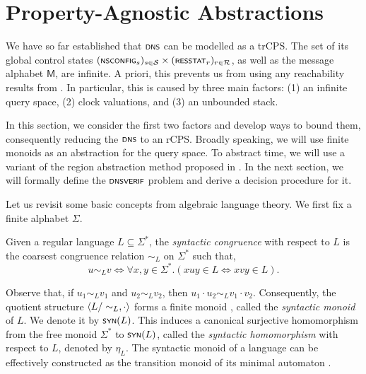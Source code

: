 \section{\label{sec:property-agnostic}Property-Agnostic Abstractions}

We have so far established that $\scrsf{dns}$ can be modelled as a trCPS. The set of its global control states $(\scrsf{nsconfig}_{s})_{s\in\cal S} \times (\scrsf{resstat}_r)_{r\in\cal R}$, as well as the message alphabet $\mathsf M$, are infinite. A priori, this prevents us from using any reachability results from . In particular, this is caused by three main factors: (1) an infinite query space, (2) clock valuations, and (3) an unbounded stack.

In this section, we  consider the first two factors and develop ways to bound them, consequently reducing the $\scrsf{dns}$ to an rCPS. Broadly speaking, we will use finite monoids as an abstraction for the query space. To abstract time, we will use a variant of the region abstraction method proposed in \cite{alur1994theory}. In the next section, we will formally define the $\verif$ problem and derive a decision procedure for it.

Let us revisit some basic concepts from algebraic language theory. We first fix a finite alphabet $\Sigma$.

\begin{definition}
	Given a regular language $L\subseteq \Sigma^*$, the \emph{syntactic congruence} with respect to $L$ is the coarsest congruence relation $\sim_L$ on $\Sigma^*$ such that,
	\[u \sim_L v \iff \forall x,y\in\Sigma^*. (xuy \in L \Leftrightarrow xvy \in L).\]
\end{definition}
Observe that, if $u_1 \sim_L v_1$ and $u_2 \sim_L v_2$, then $u_1\cdot u_2 \sim_L v_1\cdot v_2$. Consequently, the quotient structure $\langle L/\sim_L, \cdot \rangle$ forms a finite monoid \cite{nerode1958synmon,rabinscott1959synmon}, called the \emph{syntactic monoid} of $L$. We denote it by $\scrsf{syn}(L)$. This induces a canonical surjective homomorphism from the free monoid $\Sigma^*$ to $\scrsf{syn}(L)$, called the \emph{syntactic homomorphism} with respect to $L$, denoted by $\eta_L$. The syntactic monoid of a language can be effectively constructed \cite{kozen2012automata} as the transition monoid of its minimal automaton \cite{1957fundamental}.

